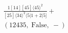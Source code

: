 \documentclass[varwidth, border=5pt]{standalone}
\begin{document}
\begin{my}
$\begin{gathered}
\scriptscriptstyle\frac{1[14][45]⟨45⟩^2}{[25]⟨34⟩^2⟨5|1+2|5]}+\\
\scriptscriptstyle(12435,\;\text{False},\;-)\phantom{+}
\end{gathered}$
\end{my}
\end{document}
